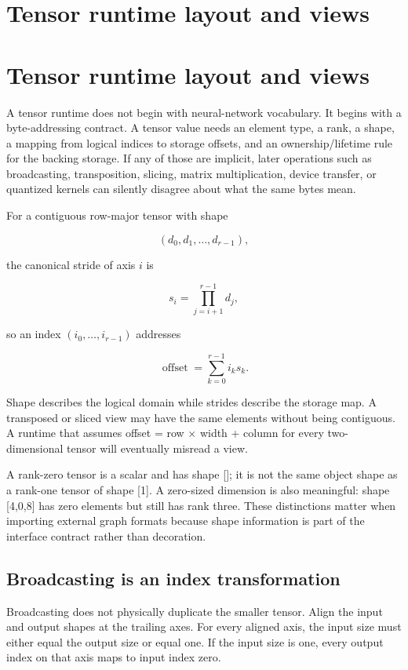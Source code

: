 \hypertarget{appendix-cebadf3106d1}{}
\section*{Tensor runtime layout and views}
\section{Tensor runtime layout and views}\label{tensor-runtime-layout-and-views}

A tensor runtime does not begin with neural-network vocabulary. It begins with a byte-addressing contract. A tensor value needs an element type, a rank, a shape, a mapping from logical indices to storage offsets, and an ownership/lifetime rule for the backing storage. If any of those are implicit, later operations such as broadcasting, transposition, slicing, matrix multiplication, device transfer, or quantized kernels can silently disagree about what the same bytes mean.

For a contiguous row-major tensor with shape

\[
(d_0,d_1,\ldots,d_{r-1}),
\]

the canonical stride of axis \(i\) is

\[
s_i = \prod_{j=i+1}^{r-1} d_j,
\]

so an index \((i_0,\ldots,i_{r-1})\) addresses

\[
\operatorname{offset}=\sum_{k=0}^{r-1} i_k s_k.
\]

Shape describes the logical domain while strides describe the storage map. A transposed or sliced view may have the same elements without being contiguous. A runtime that assumes offset = row × width + column for every two-dimensional tensor will eventually misread a view.

A rank-zero tensor is a scalar and has shape {[}{]}; it is not the same object shape as a rank-one tensor of shape {[}1{]}. A zero-sized dimension is also meaningful: shape {[}4,0,8{]} has zero elements but still has rank three. These distinctions matter when importing external graph formats because shape information is part of the interface contract rather than decoration.

\subsection{Broadcasting is an index transformation}\label{broadcasting-is-an-index-transformation}

Broadcasting does not physically duplicate the smaller tensor. Align the input and output shapes at the trailing axes. For every aligned axis, the input size must either equal the output size or equal one. If the input size is one, every output index on that axis maps to input index zero.


